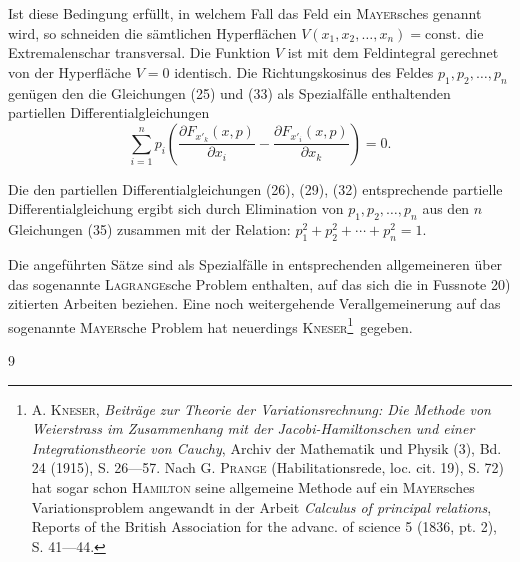 Ist diese Bedingung erfüllt, in welchem Fall das Feld ein \textsc{Mayer}sches genannt
wird, so schneiden die sämtlichen Hyperflächen $V(x_1,x_2,\ldots,x_n)=\text{const.}$
die Extremalenschar transversal. Die Funktion $V$ ist mit dem Feldintegral
gerechnet von der Hyperfläche $V=0$ identisch. Die Richtungskosinus des
Feldes $p_1,p_2,\ldots,p_n$ genügen den die Gleichungen (25) und (33) als Spezialfälle
enthaltenden partiellen Differentialgleichungen
\begin{equation*}\tag{36}
\sum_{i=1}^n p_i\left(\frac{\partial F_{x'_k}(x,p)}{\partial x_i}-\frac{\partial F_{x'_i}(x,p)}{\partial x_k}\right)=0.
\end{equation*}

Die den partiellen Differentialgleichungen (26), (29), (32) entsprechende
partielle Differentialgleichung ergibt sich durch Elimination von $p_1,p_2,\ldots,p_n$
aus den $n$ Gleichungen (35) zusammen mit der Relation: $p_1^2+p_2^2+\cdots+p_n^2=1$.

Die angeführten Sätze sind als Spezialfälle in entsprechenden allgemeineren
über das sogenannte \textsc{Lagrange}sche Problem enthalten, auf das sich die in
Fussnote 20) zitierten Arbeiten beziehen. Eine noch weitergehende Verallgemeinerung
auf das sogenannte \textsc{Mayer}sche Problem hat neuerdings \textsc{Kneser}\begingroup\renewcommand{\thefootnote}{20a)}\footnote{A. \textsc{Kneser}, \textit{Beiträge zur Theorie der Variationsrechnung: Die Methode von Weierstrass im
Zusammenhang mit der Jacobi-Hamiltonschen und einer Integrationstheorie von Cauchy}, Archiv der Mathematik
und Physik (3), Bd. 24 (1915), S. 26—57. Nach G. \textsc{Prange} (Habilitationsrede, loc. cit. 19), S. 72)
hat sogar schon \textsc{Hamilton} seine allgemeine Methode auf ein \textsc{Mayer}sches Variationsproblem angewandt in
der Arbeit \textit{Calculus of principal relations}, Reports of the British Association for the advanc. of science 5
(1836, pt. 2), S. 41—44.}\endgroup\ gegeben.
\par\smallskip{}\hfill{\small 9}\par
\clearpage\endgroup
